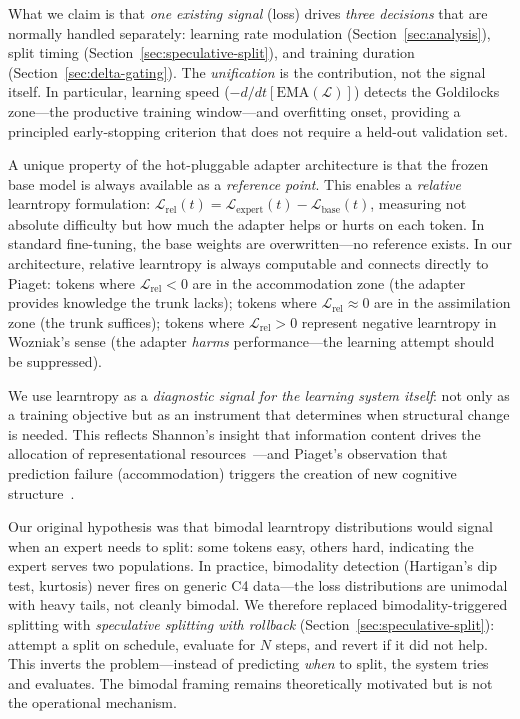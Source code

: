 \documentclass{article}
\begin{document}
What we claim is that \emph{one existing signal} (loss) drives
\emph{three decisions} that are normally handled separately: learning
rate modulation (Section~\ref{sec:analysis}), split timing
(Section~\ref{sec:speculative-split}), and training duration
(Section~\ref{sec:delta-gating}). The \emph{unification} is the
contribution, not the signal itself. In particular, learning speed
($-d/dt[\text{EMA}(\mathcal{L})]$) detects the Goldilocks zone---the
productive training window---and overfitting onset, providing a
principled early-stopping criterion that does not require a held-out
validation set.

A unique property of the hot-pluggable adapter architecture is that the
frozen base model is always available as a \emph{reference point}. This
enables a \emph{relative} learntropy formulation:
$\mathcal{L}_{\text{rel}}(t) = \mathcal{L}_{\text{expert}}(t) -
\mathcal{L}_{\text{base}}(t)$, measuring not absolute difficulty but
how much the adapter helps or hurts on each token. In standard
fine-tuning, the base weights are overwritten---no reference exists.
In our architecture, relative learntropy is always computable and
connects directly to Piaget: tokens where $\mathcal{L}_{\text{rel}} < 0$
are in the accommodation zone (the adapter provides knowledge the trunk
lacks); tokens where $\mathcal{L}_{\text{rel}} \approx 0$ are in the
assimilation zone (the trunk suffices); tokens where
$\mathcal{L}_{\text{rel}} > 0$ represent negative learntropy in
Wozniak's sense (the adapter \emph{harms} performance---the learning
attempt should be suppressed).

We use learntropy as a \emph{diagnostic signal for the learning system itself}: not only as a training objective but as an instrument that determines when structural change is needed. This reflects Shannon's insight that information content drives the allocation of representational resources~\cite{shannon1948}---and Piaget's observation that prediction failure (accommodation) triggers the creation of new cognitive structure~\cite{piaget1952}.

Our original hypothesis was that bimodal learntropy distributions would
signal when an expert needs to split: some tokens easy, others hard,
indicating the expert serves two populations. In practice, bimodality
detection (Hartigan's dip test, kurtosis) never fires on generic C4
data---the loss distributions are unimodal with heavy tails, not cleanly
bimodal. We therefore replaced bimodality-triggered splitting with
\emph{speculative splitting with rollback}
(Section~\ref{sec:speculative-split}): attempt a split on schedule,
evaluate for $N$ steps, and revert if it did not help. This inverts
the problem---instead of predicting \emph{when} to split, the system
tries and evaluates. The bimodal framing remains theoretically
motivated but is not the operational mechanism.
\end{document}
